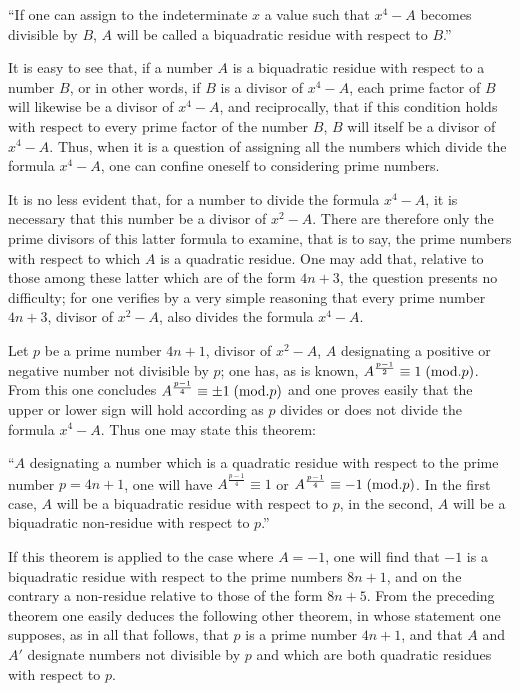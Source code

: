 \par\indent
“If one can assign to the indeterminate $x$ a value such that $x^4-A$ becomes
divisible by $B$, $A$ will be called a biquadratic residue with respect to $B$.”
\par\indent
It is easy to see that, if a number $A$ is a biquadratic residue with respect to
a number $B$, or in other words, if $B$ is a divisor of $x^4-A$, each prime factor
of $B$ will likewise be a divisor of $x^4-A$, and reciprocally, that if this condition
holds with respect to every prime factor of the number $B$, $B$ will itself be
a divisor of $x^4-A$. Thus, when it is a question of assigning all the numbers
which divide the formula $x^4-A$, one can confine oneself to considering prime numbers.
\par\indent
It is no less evident that, for a number to divide the formula $x^4-A$, it is
necessary that this number be a divisor of $x^2-A$. There are therefore only
the prime divisors of this latter formula to examine, that is to say, the prime
numbers with respect to which $A$ is a quadratic residue. One may add that,
relative to those among these latter which are of the form $4n+3$, the question
presents no difficulty; for one verifies by a very simple reasoning that every
prime number $4n+3$, divisor of $x^2-A$, also divides the formula $x^4-A$.
\par\indent
Let $p$ be a prime number $4n+1$, divisor of $x^2-A$, $A$ designating a positive
or negative number not divisible by $p$; one has, as is known,
$A^{\frac{p-1}{2}}\equiv1\;(\mathrm{mod}.p)$. From this one concludes
$A^{\frac{p-1}{4}}\equiv\pm1\;(\mathrm{mod}.p)$ and one proves easily that the upper or lower
sign will hold according as $p$ divides or does not divide the formula $x^4-A$.
Thus one may state this theorem:
\par\indent
“$A$ designating a number which is a quadratic residue with respect to the
prime number $p=4n+1$, one will have $A^{\frac{p-1}{4}}\equiv1$ or
$A^{\frac{p-1}{4}}\equiv-1\;(\mathrm{mod}.p)$. In the first case, $A$ will be a biquadratic
residue with respect to $p$, in the second, $A$ will be a biquadratic non-residue
with respect to $p$.”
\par\indent
If this theorem is applied to the case where $A=-1$, one will find that $-1$
is a biquadratic residue with respect to the prime numbers $8n+1$, and on the
contrary a non-residue relative to those of the form $8n+5$. From the preceding
theorem one easily deduces the following other theorem, in whose statement one
supposes, as in all that follows, that $p$ is a prime number $4n+1$, and that
$A$ and $A'$ designate numbers not divisible by $p$ and which are both quadratic
residues with respect to $p$.
